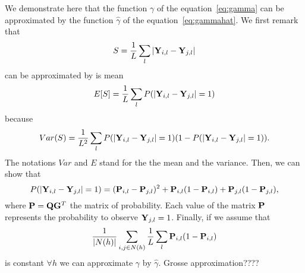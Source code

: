 We demonstrate here that the function $\gamma$ of the equation~\eqref{eq:gamma} can be approximated by the function $\hat{\gamma}$ of the equation~\eqref{eq:gammahat}. We first remark that
$$
S = \frac{1}{L} \sum_l |{\bf Y}_{i,l} - {\bf Y}_{j,l}|
$$
can be approximated by is mean 
$$
E[S] = \frac{1}{L} \sum_l P(|{\bf Y}_{i,l} - {\bf Y}_{j,l}| = 1)
$$
because 
$$
Var(S) = \frac{1}{L^2} \sum_l P(|{\bf Y}_{i,l} - {\bf Y}_{j,l}| = 1) 
( 1 - P(|{\bf Y}_{i,l} - {\bf Y}_{j,l}| = 1)).
$$
The notations $Var$ and $E$ stand for the the mean and the variance. Then, we can show that 
$$
P(|{\bf Y}_{i,l} - {\bf Y}_{j,l}| = 1) = ({\bf P}_{i,l} - {\bf P}_{j,l})^2 + {\bf P}_{i,l} (1 - {\bf P}_{i,l}) + {\bf P}_{j,l} (1 - {\bf P}_{j,l}),
$$
\noindent where ${\bf P} = {\bf Q} {\bf G}^T$ the matrix of probability. Each value of the matrix ${\bf P}$ represents the probability to observe ${\bf Y}_{j,l} = 1$. Finally, if we assume that 
$$
\frac{1}{|N(h)|} \sum_{i,j \in N(h)} \frac{1}{L} \sum_l  {\bf P}_{i,l} (1 - {\bf P}_{i,l})
$$
is constant $\forall h$ we can approximate $\gamma$ by $\hat{\gamma}$. 
Grosse approximation????
